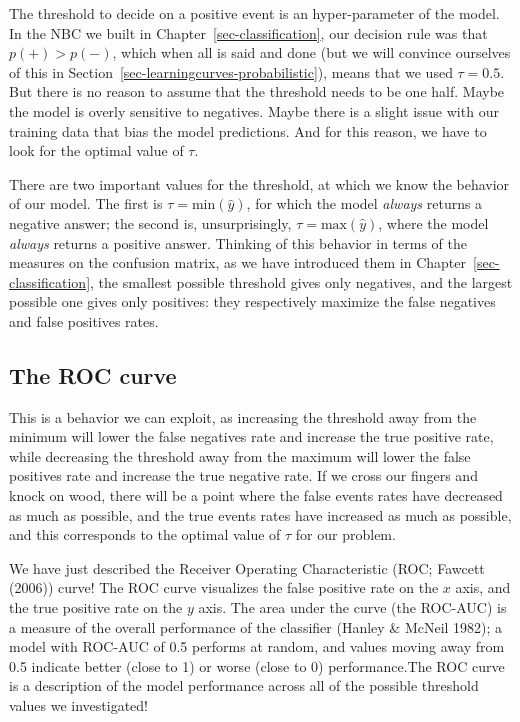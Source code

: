 \documentclass[
  letterpaper,
]{scrbook}
\begin{document}
The threshold to decide on a positive event is an hyper-parameter of the
model. In the NBC we built in Chapter~\ref{sec-classification}, our
decision rule was that \(p(+) > p(-)\), which when all is said and done
(but we will convince ourselves of this in
Section~\ref{sec-learningcurves-probabilistic}), means that we used
\(\tau = 0.5\). But there is no reason to assume that the threshold
needs to be one half. Maybe the model is overly sensitive to negatives.
Maybe there is a slight issue with our training data that bias the model
predictions. And for this reason, we have to look for the optimal value
of \(\tau\).

There are two important values for the threshold, at which we know the
behavior of our model. The first is \(\tau = \text{min}(\hat y)\), for
which the model \emph{always} returns a negative answer; the second is,
unsurprisingly, \(\tau = \text{max}(\hat y)\), where the model
\emph{always} returns a positive answer. Thinking of this behavior in
terms of the measures on the confusion matrix, as we have introduced
them in Chapter~\ref{sec-classification}, the smallest possible
threshold gives only negatives, and the largest possible one gives only
positives: they respectively maximize the false negatives and false
positives rates.

\subsection{The ROC curve}\label{the-roc-curve}

This is a behavior we can exploit, as increasing the threshold away from
the minimum will lower the false negatives rate and increase the true
positive rate, while decreasing the threshold away from the maximum will
lower the false positives rate and increase the true negative rate. If
we cross our fingers and knock on wood, there will be a point where the
false events rates have decreased as much as possible, and the true
events rates have increased as much as possible, and this corresponds to
the optimal value of \(\tau\) for our problem.

We have just described the Receiver Operating Characteristic (ROC;
Fawcett (2006)) curve! The ROC curve visualizes the false positive rate
on the \(x\) axis, and the true positive rate on the \(y\) axis. The
area under the curve (the ROC-AUC) is a measure of the overall
performance of the classifier (Hanley \& McNeil 1982); a model with
ROC-AUC of 0.5 performs at random, and values moving away from 0.5
indicate better (close to 1) or worse (close to 0) performance.The ROC
curve is a description of the model performance across all of the
possible threshold values we investigated!
\end{document}
